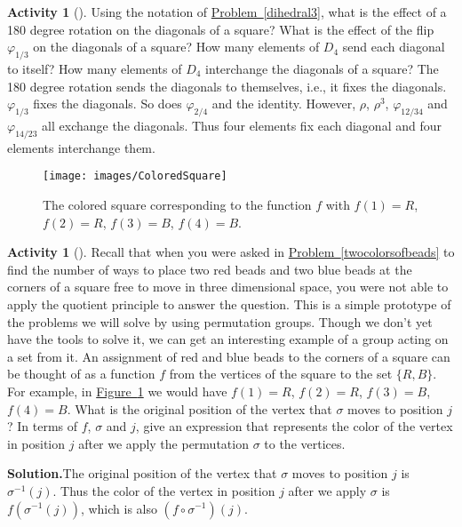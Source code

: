 \documentclass[10pt,]{book}
\theoremstyle{plain}
\theoremstyle{definition}
\newtheorem{activity}[project]{Activity}
\numberwithin{equation}{chapter}
\begin{document}
\begin{activity}[]\label{activity-268}
Using the notation of \hyperref[dihedral3]{Problem~\ref{dihedral3}}, what is the effect of a 180 degree rotation on the diagonals of a square? What is the effect of the flip \(\varphi_{1/3}\) on the diagonals of a square? How many elements of \(D_4\) send each diagonal to itself? How many elements of \(D_4\) interchange the diagonals of a square?%
The 180 degree rotation sends the diagonals to themselves, i.e., it fixes the diagonals. \(\varphi_{1/3}\) fixes the diagonals. So does \(\varphi_{2/4}\) and the identity. However, \(\rho\), \(\rho^3\), \(\varphi_{12/34}\) and \(\varphi_{14/23}\) all exchange the diagonals. Thus four elements fix each diagonal and four elements interchange them.%
\begin{figure}
\centering
\texttt{[image: images/ColoredSquare]}
\caption{The colored square corresponding to the function \(f\) with \(f(1) =R\), \(f(2)
= R\), \(f(3)=B\), \(f(4)=B\).\label{ColoredSquare}}
\end{figure}
\end{activity}
\begin{activity}[]\label{actiononfunctions}
Recall that when you were asked in \hyperref[twocolorsofbeads]{Problem~\ref{twocolorsofbeads}} to find the number of ways to place two red beads and two blue beads at the corners of a square free to move in three dimensional space, you were not able to apply the quotient principle to answer the question. This is a simple prototype of the problems we will solve by using permutation groups. Though we don't yet have the tools to solve it, we can get an interesting example of a group acting on a set from it. An assignment of red and blue beads to the corners of a square can be thought of as a function \(f\) from the vertices of the square to the set \(\{R,B\}\). For example, in \hyperref[ColoredSquare]{Figure~\ref{ColoredSquare}} we would have \(f(1) =R\), \(f(2)
= R\), \(f(3)=B\), \(f(4)=B\). What is the original position of the vertex that \(\sigma\) moves to position \(j\)? In terms of \(f\), \(\sigma\) and \(j\), give an expression that represents the color of the vertex in position \(j\) after we apply the permutation \(\sigma\) to the vertices.%
\par\medskip\noindent%
\textbf{Solution.}\quad The original position of the vertex that \(\sigma\) moves to position \(j\) is \(\sigma^{-1}(j)\). Thus the color of the vertex in position \(j\) after we apply \(\sigma\) is \(f(\sigma^{-1}(j))\), which is also \((f\circ
\sigma^{-1})(j)\).%
\end{activity}
\end{document}
